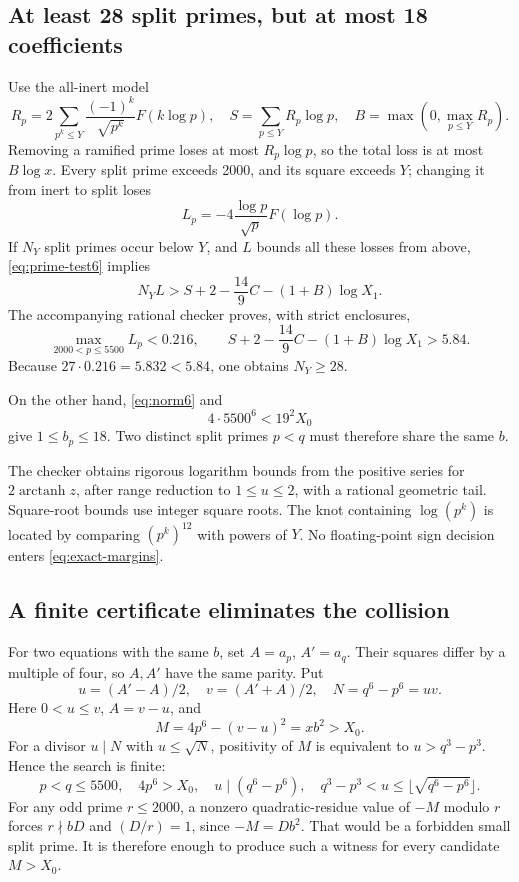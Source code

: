 \subsection{At least 28 split primes, but at most 18 coefficients}

Use the all-inert model
\[
 R_p=2\sum_{p^k\le Y}\frac{(-1)^k}{\sqrt{p^k}}F(k\log p),
 \quad S=\sum_{p\le Y}R_p\log p,
 \quad B=\max(0,\max_{p\le Y}R_p).
\]
Removing a ramified prime loses at most $R_p\log p$, so the total loss is at most $B\log x$. Every split prime exceeds 2000, and its square exceeds $Y$; changing it from inert to split loses
\[
 L_p=-4\frac{\log p}{\sqrt p}F(\log p).
\]
If $N_Y$ split primes occur below $Y$, and $L$ bounds all these losses from above, \eqref{eq:prime-test6} implies
\[
 N_Y L>S+2-\frac{14}9C-(1+B)\log X_1.
\]
The accompanying rational checker proves, with strict enclosures,
\begin{equation}\label{eq:exact-margins}
 \max_{2000<p\le5500}L_p<0.216,
 \qquad S+2-\frac{14}9C-(1+B)\log X_1>5.84.
\end{equation}
Because $27\cdot0.216=5.832<5.84$, one obtains $N_Y\ge28$.

On the other hand, \eqref{eq:norm6} and
\[
 4\cdot5500^6<19^2X_0
\]
give $1\le b_p\le18$. Two distinct split primes $p<q$ must therefore share the same $b$.

The checker obtains rigorous logarithm bounds from the positive series for $2\operatorname{arctanh}z$, after range reduction to $1\le u\le2$, with a rational geometric tail. Square-root bounds use integer square roots. The knot containing $\log(p^k)$ is located by comparing $(p^k)^{12}$ with powers of $Y$. No floating-point sign decision enters \eqref{eq:exact-margins}.

\subsection{A finite certificate eliminates the collision}

For two equations with the same $b$, set $A=a_p$, $A'=a_q$. Their squares differ by a multiple of four, so $A,A'$ have the same parity. Put
\[
 u=(A'-A)/2,\quad v=(A'+A)/2,\quad
 N=q^6-p^6=uv.
\]
Here $0<u\le v$, $A=v-u$, and
\begin{equation}\label{eq:candidate6}
 M=4p^6-(v-u)^2=x b^2>X_0.
\end{equation}
For a divisor $u\mid N$ with $u\le\sqrt N$, positivity of $M$ is equivalent to $u>q^3-p^3$. Hence the search is finite:
\[
 p<q\le5500,\quad 4p^6>X_0,\quad
 u\mid(q^6-p^6),\quad q^3-p^3<u\le\lfloor\sqrt{q^6-p^6}\rfloor.
\]
For any odd prime $r\le2000$, a nonzero quadratic-residue value of $-M$ modulo $r$ forces $r\nmid bD$ and $(D/r)=1$, since $-M=Db^2$. That would be a forbidden small split prime. It is therefore enough to produce such a witness for every candidate $M>X_0$.


